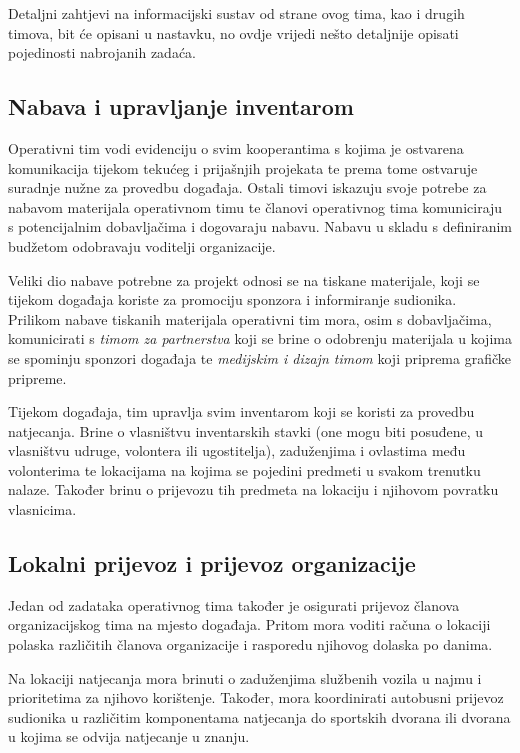 \documentclass[times, utf8, diplomski]{fer}
\begin{document}
Detaljni zahtjevi na informacijski sustav od strane ovog tima, kao i drugih
timova, bit će opisani u nastavku, no ovdje vrijedi nešto detaljnije opisati
pojedinosti nabrojanih zadaća.

\subsection{Nabava i upravljanje inventarom}
Operativni tim vodi evidenciju o svim kooperantima s kojima je ostvarena
komunikacija tijekom tekućeg i prijašnjih projekata te prema tome ostvaruje
suradnje nužne za provedbu događaja. Ostali timovi iskazuju svoje potrebe za
nabavom materijala operativnom timu te članovi operativnog tima komuniciraju s
potencijalnim dobavljačima i dogovaraju nabavu. Nabavu u skladu s definiranim
budžetom odobravaju voditelji organizacije.

Veliki dio nabave potrebne za projekt odnosi se na tiskane materijale, koji se
tijekom događaja koriste za promociju sponzora i informiranje sudionika.
Prilikom nabave tiskanih materijala operativni tim mora, osim s dobavljačima,
komunicirati s \emph{timom za partnerstva} koji se brine o odobrenju materijala u
kojima se spominju sponzori događaja te \emph{medijskim i dizajn timom} koji
priprema grafičke pripreme.

Tijekom događaja, tim upravlja svim inventarom koji se koristi za provedbu
natjecanja. Brine o vlasništvu inventarskih stavki (one mogu biti posuđene, u
vlasništvu udruge, volontera ili ugostitelja), zaduženjima i ovlastima među
volonterima te lokacijama na kojima se pojedini predmeti u svakom trenutku
nalaze. Također brinu o prijevozu tih predmeta na lokaciju i njihovom povratku
vlasnicima.

\subsection{Lokalni prijevoz i prijevoz organizacije}

Jedan od zadataka operativnog tima također je osigurati prijevoz članova
organizacijskog tima na mjesto događaja. Pritom mora voditi računa o lokaciji
polaska različitih članova organizacije i rasporedu njihovog dolaska po danima.

Na lokaciji natjecanja mora brinuti o zaduženjima službenih vozila u najmu i
prioritetima za njihovo korištenje. Također, mora koordinirati autobusni
prijevoz sudionika u različitim komponentama natjecanja do sportskih dvorana ili
dvorana u kojima se odvija natjecanje u znanju.
\end{document}
